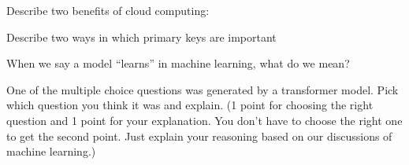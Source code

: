 \documentclass{exam}
\begin{document}
\begin{questions}
\question[3] Describe two benefits of cloud computing:
\newpage

\question[2] Describe two ways in which primary keys are important
\vspace{2in}

\question[3] When we say a model ``learns'' in machine learning, what do we mean?
\vspace{2in}


\bonusquestion[2] One of the multiple choice questions was generated by a transformer model. Pick which question you think it was and explain. (1 point for choosing the right question and 1 point for your explanation. You don't have to choose the right one to get the second point. Just explain your reasoning based on our discussions of machine learning.)
\end{questions}
\end{document}
